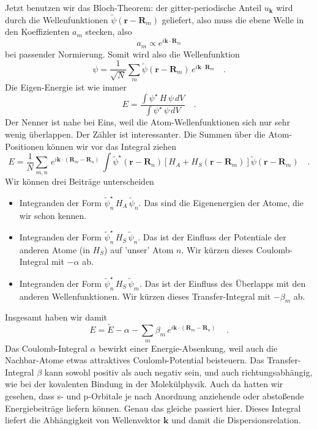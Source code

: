 Jetzt benutzen wir das Bloch-Theorem: der gitter-periodische Anteil $u_\mathbf{k}$ wird durch die Wellenfunktionen $\tilde{\psi} (\mathbf{r} - \mathbf{R}_m)$ geliefert, also muss die ebene Welle in den Koeffizienten $a_m$ stecken, also
\begin{equation}
    a_m \propto e^{i \mathbf{k} \cdot \mathbf{R}_m}
\end{equation}
bei passender Normierung. Somit wird also die Wellenfunktion 
\begin{equation}
    \psi = \frac{1}{\sqrt{N}} \sum_m  \tilde{\psi} (\mathbf{r} - \mathbf{R}_m) \, e^{i \mathbf{k} \cdot \mathbf{R}_m} \quad .
\end{equation}
Die Eigen-Energie ist wie immer
\begin{equation}
    E = \frac{\int \psi^\star \, H \, \psi \, dV }{\int \psi^\star \, \psi \, dV} \quad .
\end{equation}
Der Nenner ist nahe bei Eins, weil die Atom-Wellenfunktionen sich nur sehr wenig überlappen. Der Zähler ist interessanter. Die Summen über die Atom-Positionen können wir vor das Integral ziehen 
\begin{equation}
    E = \frac{1}{N} \sum_{m,n} \, e^{i \mathbf{k} \cdot (\mathbf{R}_m  - \mathbf{R}_n) }\,
    \int \tilde{\psi}^\star (\mathbf{r} - \mathbf{R}_n) \left[ H_A + H_S(\mathbf{r} - \mathbf{R}_m) \right] \tilde{\psi} (\mathbf{r} - \mathbf{R}_m) \quad .
\end{equation}
Wir können drei Beiträge unterscheiden
\begin{itemize}
\item Integranden der Form $\tilde{\psi}^\star_n \, H_A  \, \tilde{\psi}_n$. Das sind die Eigenenergien der Atome, die wir schon kennen.
\item  Integranden der Form $\tilde{\psi}^\star_n \, H_S  \, \tilde{\psi}_n$. Das ist der Einfluss der Potentiale der anderen Atome (in $H_S$) auf 'unser' Atom $n$. Wir kürzen dieses Coulomb-Integral mit $-\alpha$ ab.
\item Integranden der Form $\tilde{\psi}^\star_n \, H_S  \, \tilde{\psi}_m$. Das ist der Einfluss des Überlapps mit den  anderen Wellenfunktionen. 
 Wir kürzen dieses Transfer-Integral mit $-\beta_m$ ab.
\end{itemize}    
Insgesamt haben wir damit
\begin{equation}
    E = \tilde{E} - \alpha - \sum_m \beta_m  \, e^{i \mathbf{k} \cdot (\mathbf{R}_m  - \mathbf{R}_n) }\, \quad .
\end{equation}
Das Coulomb-Integral $\alpha$ bewirkt einer Energie-Absenkung, weil auch die Nachbar-Atome etwas attraktives Coulomb-Potential beisteuern. Das Transfer-Integral $\beta$ kann sowohl positiv als auch negativ sein, und auch richtungsabhängig, wie bei der kovalenten Bindung in der Molekülphysik. Auch da hatten wir gesehen, dass s- und p-Orbitale je nach Anordnung anziehende oder abstoßende Energiebeiträge liefern können. Genau das gleiche passiert hier. Dieses Integral liefert die Abhängigkeit von Wellenvektor $\mathbf{k}$ und damit die Dispersionsrelation.


